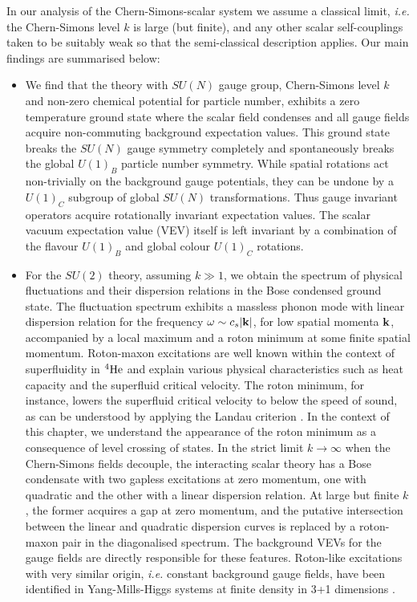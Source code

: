  In our analysis of the Chern-Simons-scalar system we  assume a classical limit, \textit{i.e.}  the Chern-Simons level $k$ is large (but finite), and any other scalar self-couplings taken to be  suitably weak so that the semi-classical description applies.  Our main findings are summarised below:
 \begin{itemize}
     \item{We find that the theory with $SU(N)$ gauge group, Chern-Simons level $k$ and non-zero chemical potential for particle number, exhibits a zero temperature ground state where  the scalar field condenses and all gauge fields acquire non-commuting background expectation values.  This ground state breaks the $SU(N)$ gauge symmetry completely and spontaneously breaks the global $U(1)_B$ particle number symmetry. While spatial rotations act non-trivially on the background gauge potentials, they  can be undone by a $U(1)_C$ subgroup of global $SU(N)$ transformations.  Thus gauge invariant operators acquire rotationally  invariant expectation values. The scalar vacuum expectation value (VEV) itself is left invariant by a combination of the flavour $U(1)_B$ and global colour $U(1)_C$ rotations. }
 \item{For the $SU(2)$ theory, assuming $k\gg 1$, we obtain the spectrum of physical fluctuations and their dispersion relations in the Bose condensed ground state. The fluctuation spectrum exhibits a massless phonon mode with linear dispersion relation 
     for the frequency $\omega\sim c_s |{\bf k}|$, for low spatial momenta ${\bf k}$, accompanied by a local maximum and a roton minimum at some finite spatial momentum.  Roton-maxon excitations are well known within the context of superfluidity in ${}^4{\rm He}$  \cite{Landau:1941vsj, Schmitt:2014eka} and explain various physical characteristics such as heat capacity and the superfluid critical velocity. The roton minimum, for instance, lowers the superfluid critical velocity to below the speed of sound, as can be understood by applying the Landau criterion \cite{Landau:1941vsj, Schmitt:2014eka}. In the context of this chapter, we understand the appearance of the roton minimum as a consequence of level crossing of states. In the strict limit $k\to \infty$ when the Chern-Simons fields decouple, the interacting scalar theory has a Bose condensate with two gapless excitations at zero momentum, one with quadratic and the other with a linear dispersion relation. At  large but finite $k$, the former acquires a gap at zero momentum, and the putative intersection between the linear and quadratic dispersion curves is replaced by a roton-maxon pair in the diagonalised spectrum. The background VEVs for the gauge fields are directly responsible for these features. Roton-like excitations with very similar origin, \textit{i.e.} constant background gauge fields, have been identified in Yang-Mills-Higgs systems at finite density in 3+1 dimensions \cite{Gusynin:2003yu}.
 
}
\end{itemize}
